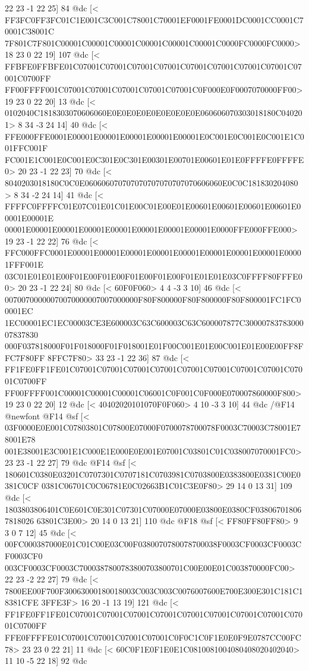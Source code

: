 	 22 23 -1 22 25] 84 @dc
[<
FF3FC0FF3FC01C1E001C3C001C78001C70001EF0001FE0001DC0001CC0001C70001C38001C
7F801C7F801C00001C00001C00001C00001C00001C00001C0000FC0000FC0000>
	 18 23 0 22 19] 107 @dc
[<
FFBFE0FFBFE01C07001C07001C07001C07001C07001C07001C07001C07001C07001C0700FF
FF00FFFF001C07001C07001C07001C07001C07001C0F000E0F0007070000FF00>
	 19 23 0 22 20] 13 @dc
[<
0102040C1818303070606060E0E0E0E0E0E0E0E0E0E060606070303018180C040201>
	 8 34 -3 24 14] 40 @dc
[<
FFE000FFE0001E00001E00001E00001E00001E00001E0C001E0C001E0C001E1C001FFC001F
FC001E1C001E0C001E0C301E0C301E00301E00701E00601E01E0FFFFE0FFFFE0>
	 20 23 -1 22 23] 70 @dc
[<
8040203018180C0C0E060606070707070707070707070606060E0C0C181830204080>
	 8 34 -2 24 14] 41 @dc
[<
FFFFC0FFFFC01E07C01E01C01E00C01E00E01E00601E00601E00601E00601E00001E00001E
00001E00001E00001E00001E00001E00001E00001E00001E0000FFE000FFE000>
	 19 23 -1 22 22] 76 @dc
[<
FFC000FFC0001E00001E00001E00001E00001E00001E00001E00001E00001E00001FFF001E
03C01E01E01E00F01E00F01E00F01E00F01E00F01E01E01E03C0FFFF80FFFE00>
	 20 23 -1 22 24] 80 @dc
[<
60F0F060>
	 4 4 -3 3 10] 46 @dc
[<
00700700000070070000007007000000F80F800000F80F800000F80F800001FC1FC00001EC
1EC00001EC1EC00003CE3E600003C63C600003C63C600007877C3000078378300007837830
000F037818000F01F018000F01F018001E01F00C001E01E00C001E01E00E00FF8FFC7F80FF
8FFC7F80>
	 33 23 -1 22 36] 87 @dc
[<
FF1FE0FF1FE01C07001C07001C07001C07001C07001C07001C07001C07001C07001C0700FF
FF00FFFF001C00001C00001C00001C06001C0F001C0F000E070007860000F800>
	 19 23 0 22 20] 12 @dc
[<
40402020101070F0F060>
	 4 10 -3 3 10] 44 @dc
/@F14 @newfont
@F14 @sf
[<
03F0000E0E001C07803801C07800E07000F0700078700078F0003C70003C78001E78001E78
001E38001E3C001E1C000E1E000E0E001E07001C03801C01C038007070001FC0>
	 23 23 -1 22 27] 79 @dc
@F14 @sf
[<
180601C0380E03201C0707301C0707181C0703981C0703800E0383800E0381C00E0381C0CF
0381C06701C0C06781E0C02663B1C01C3E0F80>
	 29 14 0 13 31] 109 @dc
[<
1803803806401C0E601C0E301C07301C07000E07000E03800E0380CF038067018067818026
63801C3E00>
	 20 14 0 13 21] 110 @dc
@F18 @sf
[<
FF80FF80FF80>
	 9 3 0 7 12] 45 @dc
[<
00FC000387000E01C01C00E03C00F0380070780078700038F0003CF0003CF0003CF0003CF0
003CF0003CF0003C7000387800783800703800701C00E00E01C003870000FC00>
	 22 23 -2 22 27] 79 @dc
[<
7800EE00F700F30063000180018003C003C003C0076007600E700E300E301C181C18381CFE
3FFE3F>
	 16 20 -1 13 19] 121 @dc
[<
FF1FE0FF1FE01C07001C07001C07001C07001C07001C07001C07001C07001C07001C0700FF
FFE0FFFFE01C07001C07001C07001C07001C0F0C1C0F1E0E0F9E0787CC00FC78>
	 23 23 0 22 21] 11 @dc
[<
60C0F1E0F1E0E1C0810081004080408020402040>
	 11 10 -5 22 18] 92 @dc
